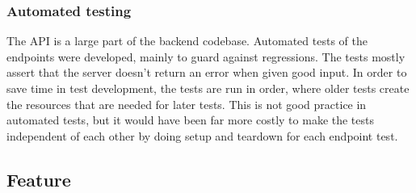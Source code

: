 \subsubsection{Automated testing}
The API is a large part of the backend codebase. Automated tests of the endpoints were developed, mainly to guard against regressions. The tests mostly assert that the server doesn't return an error when given good input. In order to save time in test development, the tests are run in order, where older tests create the resources that are needed for later tests. This is not good practice in automated tests, but it would have been far more costly to make the tests independent of each other by doing setup and teardown for each endpoint test.

\subsection{Feature}



